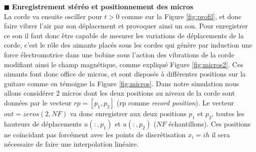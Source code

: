 \documentclass[a4,12pt]{article}
\begin{document}
\hspace{0.5cm} $\blacksquare$ \textbf{Enregistrement stéréo et positionnement des micros}\\

La corde va ensuite osciller pour $t>0$ comme sur la Figure \ref{fig:profil}, et donc faire vibrer l'air par son déplacement et provoquer ainsi un son. Pour enregistrer ce son il faut donc être capable de mesurer les variations de déplacements de la corde, c'est le rôle des aimants placés sous les cordes qui génère par induction une force électromotrice dans une bobine sous l'action des vibrations de la corde modifiant ainsi le champ magnétique, comme expliqué Figure \ref{fig:micros2}. Ces aimants font donc office de micros, et sont disposés à différentes positions sur la guitare comme en témoigne la Figure \ref{fig:micros}. Dans notre simulation nous allons considérer 2 micros dont les deux positions au niveau de la corde sont données par le vecteur $rp=[p_1,p_2]$ (rp comme \textit{record position}). Le vecteur $out=zeros(2,NF)$ va donc enregistrer aux deux positions $p_1$ et $p_2$, toutes les hauteurs de déplacements $u(:,p_1)$ et $u(:,p_2)$ ($NF$ échantillons). Ces positions ne coïncidant pas forcément avec les points de discrétisation $x_i=ih$ il sera nécessaire de faire une interpolation linéaire.
\end{document}
